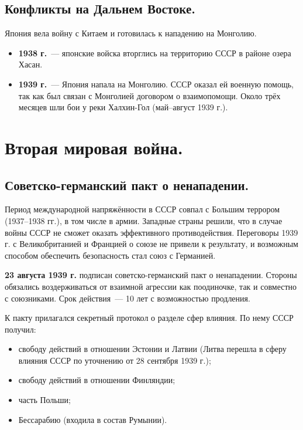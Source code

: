 \documentclass[12pt]{article}
\begin{document}
	\subsection{Конфликты на Дальнем Востоке.}
	Япония вела войну с Китаем и готовилась к нападению на Монголию.
	\begin{itemize}
		\item \textbf{1938 г.}~--- японские войска вторглись на территорию СССР в районе озера Хасан.
		\item \textbf{1939 г.}~--- Япония напала на Монголию. СССР оказал ей военную помощь, так как был связан с Монголией договором о взаимопомощи. Около трёх месяцев шли бои у реки Халхин-Гол (май--август 1939 г.).
	\end{itemize}

	\section{Вторая мировая война.}

	\subsection{Советско-германский пакт о ненападении.}
	Период международной напряжённости в СССР совпал с Большим террором (1937--1938 гг.), в том числе в армии. Западные страны решили, что в случае войны СССР не сможет оказать эффективного противодействия. Переговоры 1939 г. с Великобританией и Францией о союзе не привели к результату, и возможным способом обеспечить безопасность стал союз с Германией.
	\begin{event}
		\textbf{23 августа 1939 г.} подписан советско-германский пакт о ненападении. Стороны обязались воздерживаться от взаимной агрессии как поодиночке, так и совместно с союзниками. Срок действия~--- 10 лет с возможностью продления.
	\end{event}
	К пакту прилагался секретный протокол о разделе сфер влияния. По нему СССР получил:
	\begin{itemize}
		\item свободу действий в отношении Эстонии и Латвии (Литва перешла в сферу влияния СССР по уточнению от 28 сентября 1939 г.);
		\item свободу действий в отношении Финляндии;
		\item часть Польши;
		\item Бессарабию (входила в состав Румынии).
	\end{itemize}
\end{document}
